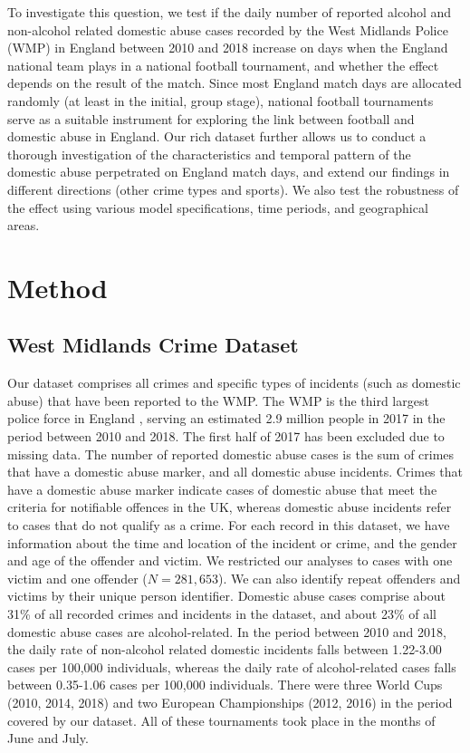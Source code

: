 \documentclass[12pt, a4paper]{article}
\begin{document}
To investigate this question, we test if the daily number of reported alcohol and non-alcohol related domestic abuse cases recorded by the West Midlands Police (WMP) in England between 2010 and 2018 increase on days when the England national team plays in a national football tournament, and whether the effect depends on the result of the match. Since most England match days are allocated randomly (at least in the initial, group stage), national football tournaments serve as a suitable instrument for exploring the link between football and domestic abuse in England.  Our rich dataset further allows us to conduct a thorough investigation of the characteristics and temporal pattern of the domestic abuse perpetrated on England match days, and extend our findings in different directions (other crime types and sports). We also test the robustness of the effect using various model specifications, time periods, and geographical areas. 
%
%
%
\newpage
\section*{Method}
%

%
\subsection*{West Midlands Crime Dataset}
%
Our dataset comprises all crimes and specific types of incidents (such as domestic abuse) that have been reported to the WMP. The WMP is the third largest police force in England \citep{Homeoffice}, serving an estimated 2.9 million people in 2017 \citep{populationfigure} in the period between 2010 and 2018. The first half of 2017 has been excluded due to missing data. The number of reported domestic abuse cases is the sum of crimes that have a domestic abuse marker, and all domestic abuse incidents. Crimes that have a domestic abuse marker indicate cases of domestic abuse that meet the criteria for notifiable offences in the UK, whereas domestic abuse incidents refer to cases that do not qualify as a crime. For each record in this dataset, we have information about the time and location of the incident or crime, and the gender and age of the offender and victim. We restricted our analyses to cases with one victim and one offender ($N=281,653$). We can also identify repeat offenders and victims by their unique person identifier. Domestic abuse cases comprise about 31\% of all recorded crimes and incidents in the dataset, and about 23\% of all domestic abuse cases are alcohol-related. In the period between 2010 and 2018, the daily rate of non-alcohol related domestic incidents falls between 1.22-3.00 cases per 100,000 individuals, whereas the daily rate of alcohol-related cases falls between 0.35-1.06 cases per 100,000 individuals. There were three World Cups (2010, 2014, 2018) and two European Championships (2012, 2016) in the period covered by our dataset. All of these tournaments took place in the months of June and July.
\end{document}
